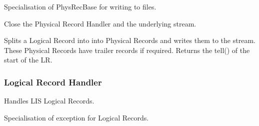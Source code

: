 \documentclass[letterpaper,10pt,english]{sphinxmanual}
\begin{document}
\begin{fulllineitems}
\label{\detokenize{ref/LIS/core/PhysRec:TotalDepth.LIS.core.PhysRec.PhysRecWrite}}
Specialisation of PhysRecBase for writing to files.

\begin{fulllineitems}
\label{\detokenize{ref/LIS/core/PhysRec:TotalDepth.LIS.core.PhysRec.PhysRecWrite.close}}
Close the Physical Record Handler and the underlying stream.

\end{fulllineitems}


\begin{fulllineitems}
\label{\detokenize{ref/LIS/core/PhysRec:TotalDepth.LIS.core.PhysRec.PhysRecWrite.writeLr}}
Splits a Logical Record into into Physical Records and writes them
to the stream. These Physical Records have trailer records if required.
Returns the tell() of the start of the LR.

\end{fulllineitems}


\end{fulllineitems}



\subsubsection{Logical Record Handler}
\label{\detokenize{ref/LIS/core/LogiRec:logical-record-handler}}\label{\detokenize{ref/LIS/core/LogiRec::doc}}\label{\detokenize{ref/LIS/core/LogiRec:module-TotalDepth.LIS.core.LogiRec}}
Handles LIS Logical Records.

\begin{fulllineitems}
\label{\detokenize{ref/LIS/core/LogiRec:TotalDepth.LIS.core.LogiRec.ExceptionLr}}
Specialisation of exception for Logical Records.

\end{fulllineitems}
\end{document}
